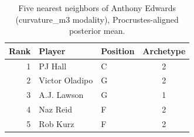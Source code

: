 \begin{table}[htbp]
  \centering\small
  \begin{tabular}{rllc}
    \toprule
    Rank & Player & Position & Archetype \\
    \midrule
    1 & PJ Hall & C & 2 \\
    2 & Victor Oladipo & G & 2 \\
    3 & A.J. Lawson & G & 1 \\
    4 & Naz Reid & F & 2 \\
    5 & Rob Kurz & F & 2 \\
    \bottomrule
  \end{tabular}
  \caption{Five nearest neighbors of Anthony Edwards (curvature_m3 modality), Procrustes-aligned posterior mean.}
  \label{tab:Anthony_Edwards_neighbors_curvature_m3}
\end{table}

